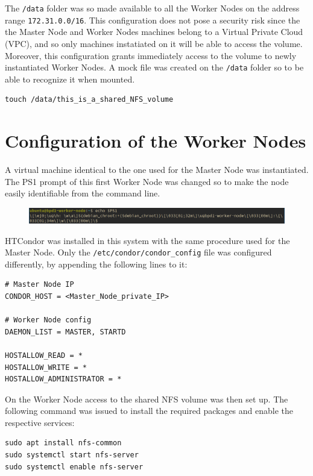 \documentclass{article}
\begin{document}
The \texttt{/data} folder was so made available to all the Worker Nodes on the address range \texttt{172.31.0.0/16}.
This configuration does not pose a security risk since the the Master Node and Worker Nodes machines belong to a Virtual Private Cloud (VPC), and so only machines instatiated on it will be able to access the volume.
Moreover, this configuration grants immediately access to the volume to newly instantiated Worker Nodes.
A mock file was created on the \texttt{/data} folder so to be able to recognize it when mounted.

\begin{lstlisting}
touch /data/this_is_a_shared_NFS_volume
\end{lstlisting}

\section{Configuration of the Worker Nodes}
A virtual machine identical to the one used for the Master Node was instantiated.
The PS1 prompt of this first Worker Node was changed so to make the node easily identifiable from the command line.

\begin{figure}[!h]
	\center
	\includegraphics[width=\textwidth]{./images/worker-ps1.png}
\end{figure}

HTCondor was installed in this system with the same procedure used for the Master Node.
Only the \texttt{/etc/condor/condor\_config} file was configured differently, by appending the following lines to it:

\begin{lstlisting}
# Master Node IP
CONDOR_HOST = <Master_Node_private_IP>

# Worker Node config
DAEMON_LIST = MASTER, STARTD

HOSTALLOW_READ = *
HOSTALLOW_WRITE = *
HOSTALLOW_ADMINISTRATOR = *
\end{lstlisting}

On the Worker Node access to the shared NFS volume was then set up.
The following command was issued to install the required packages and enable the respective services:

\begin{lstlisting}
sudo apt install nfs-common
sudo systemctl start nfs-server
sudo systemctl enable nfs-server
\end{lstlisting}
\end{document}
